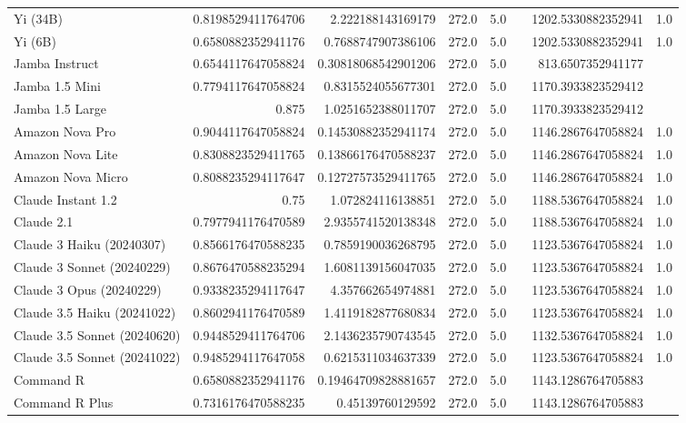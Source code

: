 \begin{table}[htp]
{\begin{tabular}{lrrrrrrr}
Yi (34B) & 0.8198529411764706 & 2.222188143169179 & 272.0 & 5.0 &  & 1202.5330882352941 & 1.0 \\
Yi (6B) & 0.6580882352941176 & 0.7688747907386106 & 272.0 & 5.0 &  & 1202.5330882352941 & 1.0 \\
Jamba Instruct & 0.6544117647058824 & 0.30818068542901206 & 272.0 & 5.0 &  & 813.6507352941177 &  \\
Jamba 1.5 Mini & 0.7794117647058824 & 0.8315524055677301 & 272.0 & 5.0 &  & 1170.3933823529412 &  \\
Jamba 1.5 Large & 0.875 & 1.0251652388011707 & 272.0 & 5.0 &  & 1170.3933823529412 &  \\
Amazon Nova Pro & 0.9044117647058824 & 0.14530882352941174 & 272.0 & 5.0 &  & 1146.2867647058824 & 1.0 \\
Amazon Nova Lite & 0.8308823529411765 & 0.13866176470588237 & 272.0 & 5.0 &  & 1146.2867647058824 & 1.0 \\
Amazon Nova Micro & 0.8088235294117647 & 0.12727573529411765 & 272.0 & 5.0 &  & 1146.2867647058824 & 1.0 \\
Claude Instant 1.2 & 0.75 & 1.072824116138851 & 272.0 & 5.0 &  & 1188.5367647058824 & 1.0 \\
Claude 2.1 & 0.7977941176470589 & 2.9355741520138348 & 272.0 & 5.0 &  & 1188.5367647058824 & 1.0 \\
Claude 3 Haiku (20240307) & 0.8566176470588235 & 0.7859190036268795 & 272.0 & 5.0 &  & 1123.5367647058824 & 1.0 \\
Claude 3 Sonnet (20240229) & 0.8676470588235294 & 1.6081139156047035 & 272.0 & 5.0 &  & 1123.5367647058824 & 1.0 \\
Claude 3 Opus (20240229) & 0.9338235294117647 & 4.357662654974881 & 272.0 & 5.0 &  & 1123.5367647058824 & 1.0 \\
Claude 3.5 Haiku (20241022) & 0.8602941176470589 & 1.4119182877680834 & 272.0 & 5.0 &  & 1123.5367647058824 & 1.0 \\
Claude 3.5 Sonnet (20240620) & 0.9448529411764706 & 2.1436235790743545 & 272.0 & 5.0 &  & 1132.5367647058824 & 1.0 \\
Claude 3.5 Sonnet (20241022) & 0.9485294117647058 & 0.6215311034637339 & 272.0 & 5.0 &  & 1123.5367647058824 & 1.0 \\
Command R & 0.6580882352941176 & 0.19464709828881657 & 272.0 & 5.0 &  & 1143.1286764705883 &  \\
Command R Plus & 0.7316176470588235 & 0.45139760129592 & 272.0 & 5.0 &  & 1143.1286764705883 &  \\

\end{tabular}}
\end{table}
